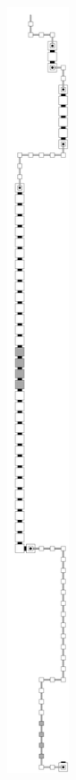         \begin{figure}[H]
            \centering
            \begin{subfigure}[t]{0.2\textwidth}
                \centering
                \includegraphics[width=0.2\textwidth]{return_paths/return_digit1_read_digit2_general}

\end{subfigure}
\end{figure}
